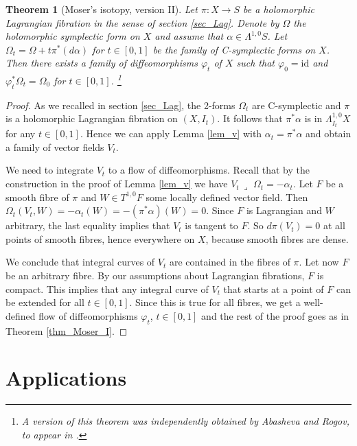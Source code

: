 \documentclass[10pt]{amsart}
\newcommand{\cnv}{\,\lrcorner\,\,}
\newtheorem{thm}[defn]{Theorem}
\begin{document}
\begin{thm}[Moser's isotopy, version II]\label{thm_Moser_II}
Let $\pi\colon X\to S$ be a holomorphic Lagrangian fibration in the sense
of section \ref{sec_Lag}. Denote by $\Omega$ the holomorphic symplectic
form on $X$ and assume that $\alpha \in \Lambda^{1,0}S$. Let $\Omega_t = \Omega + t\pi^*(d\alpha)$
for $t\in[0,1]$ be the family of C-symplectic forms on $X$.
Then there exists a family of diffeomorphisms $\varphi_t$ of $X$ such that
$\varphi_0 = \mathrm{id}$ and $\varphi_t^*\Omega_t = \Omega_0$ for $t\in [0,1]$.
\footnote{A version of this theorem was independently obtained
by Abasheva and Rogov, to appear in \cite{_Abasheva:commu_}.}
\end{thm}
\begin{proof}
As we recalled in section \ref{sec_Lag}, the 2-forms $\Omega_t$
are C-symplectic and $\pi$ is a holomorphic Lagrangian
fibration on $(X,I_t)$. It follows that $\pi^*\alpha$
is in $\Lambda^{1,0}_{I_t}X$
for any $t\in[0,1]$. Hence we can apply Lemma \ref{lem_v}
with $\alpha_t = \pi^*\alpha$ and obtain a family of vector fields $V_t$.

We need to integrate $V_t$ to a flow of diffeomorphisms. Recall that by the construction
in the proof of Lemma \ref{lem_v} we have $V_t\cnv \Omega_t = -\alpha_t$.
Let $F$ be a smooth fibre of $\pi$ and $W \in T^{1,0}F$ some locally defined vector field.
Then $\Omega_t (V_t, W) = -\alpha_t(W) = -(\pi^*\alpha)(W) = 0$. Since $F$ is
Lagrangian and $W$ arbitrary, the last equality implies that $V_t$ is tangent to $F$.
So $d\pi(V_t)=0$ at all points of smooth fibres, hence everywhere on $X$, because smooth
fibres are dense.

We conclude that integral curves of $V_t$ are contained in the fibres of $\pi$.
Let now $F$ be an arbitrary fibre. By our assumptions about Lagrangian fibrations,
$F$ is compact. %
This implies that any integral curve of $V_t$ that starts at a point of $F$
can be extended for all $t\in[0,1]$. Since this is true for all fibres, we get
a well-defined flow of diffeomorphisms $\varphi_t$, $t\in[0,1]$ and
the rest of the proof goes as in Theorem \ref{thm_Moser_I}.
\end{proof}

\section{Applications}\label{sec_appl}
\end{document}

